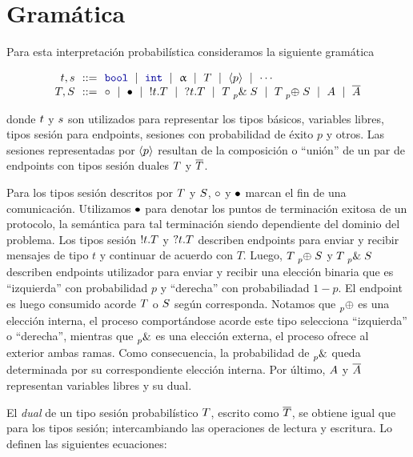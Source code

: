 \section{Gramática}

Para esta interpretación probabilística consideramos la siguiente gramática

\[
\begin{array}{@{}r@{~~}c@{~~}l@{}}
\TypeT, \TypeS & ::= &
\tbool
\rulemid \tint
\rulemid \tvar
\rulemid \SessionType
\rulemid \ClosedSessionType
\rulemid \cdots
\\
\SessionTypeT, \SessionTypeS & ::= &
\tend
\rulemid \tdone
\rulemid \cout\Type\SessionType
\rulemid \cin\Type\SessionType
\rulemid \tbranch[p]\SessionTypeT\SessionTypeS
\rulemid \tchoice[p]\SessionTypeT\SessionTypeS
\rulemid \etvar
\rulemid \dual\etvar
\end{array}
\]

donde $\TypeT$ y $\TypeS$ son utilizados para representar los tipos básicos,
variables libres, tipos sesión para endpoints, sesiones con probabilidad de
éxito $p$ y otros. Las sesiones representadas por $\ClosedSessionType$ resultan
de la composición o ``unión'' de un par de endpoints con tipos sesión duales
$\SessionTypeT$ y $\dual\SessionTypeT$.

Para los tipos sesión descritos por $\SessionTypeT$ y $\SessionTypeS$, $\tend$
y $\tdone$ marcan el fin de una comunicación. Utilizamos $\tdone$ para denotar
los puntos de terminación exitosa de un protocolo, la semántica para tal
terminación siendo dependiente del dominio del problema. Los tipos sesión
$\cout\Type\SessionType$ y $\cin\Type\SessionType$ describen endpoints para
enviar y recibir mensajes de tipo $t$ y continuar de acuerdo con $T$. Luego,
$\tchoice[p]\SessionTypeT\SessionTypeS$ y
$\tbranch[p]\SessionTypeT\SessionTypeS$ describen endpoints utilizador para
enviar y recibir una elección binaria que es ``izquierda'' con probabilidad $p$
y ``derecha'' con probabiliadad $1 - p$. El endpoint es luego consumido acorde
$\SessionTypeT$ o $\SessionTypeS$ según corresponda. Notamos que $\tchoice{}{}$
es una elección interna, el proceso comportándose acorde este tipo selecciona
``izquierda'' o ``derecha'', mientras que $\tbranch{}{}$ es una elección
externa, el proceso ofrece al exterior ambas ramas. Como consecuencia, la
probabilidad de $\tbranch{}{}$ queda determinada por su correspondiente
elección interna. Por último, $\etvar$ y $\dual\etvar$ representan variables
libres y su dual.

El \emph{dual} de un tipo sesión probabilístico $\SessionType$, escrito como
$\dual\SessionType$, se obtiene igual que para los tipos sesión; intercambiando
las operaciones de lectura y escritura. Lo definen las siguientes ecuaciones:

